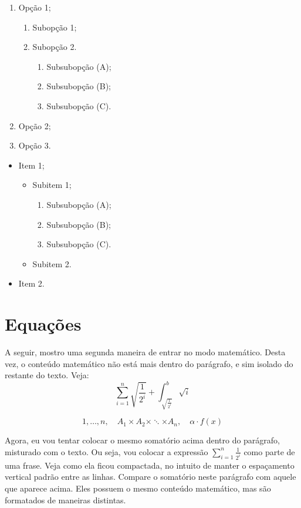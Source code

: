 \documentclass{article}
\begin{document}
\begin{enumerate}
    \item Opção 1;
    \begin{enumerate}
        \item Subopção 1;
        \item Subopção 2.
        \begin{enumerate}
            \item Subsubopção (A);
            \item Subsubopção (B);
            \item Subsubopção (C).
        \end{enumerate}
    \end{enumerate}
    \item Opção 2;
    \item Opção 3.
\end{enumerate}

\begin{itemize}
    \item Item 1;
    \begin{itemize}
        \item Subitem 1;
        \begin{enumerate}
            \item Subsubopção (A);
            \item Subsubopção (B);
            \item Subsubopção (C).
        \end{enumerate}
        \item Subitem 2.
    \end{itemize}
    \item Item 2.
\end{itemize}

\section{Equações}

A seguir, mostro uma segunda maneira de entrar no modo matemático. Desta vez, o conteúdo matemático não está mais dentro do parágrafo, e sim isolado do restante do texto. Veja:
\[
 \sum_{i=1}^{n} \sqrt{\frac{ 1 }{ 2^i }} + \int_{\sqrt{\frac{ 1 }{ 2^i }}}^{b} \sqrt{i}
\]

\[
1,\ldots,n, \quad A_1 \times A_2 \times \ddots \times A_n, \quad \alpha \cdot f(x)
\]

Agora, eu vou tentar colocar o mesmo somatório acima dentro do parágrafo, misturado com o texto. Ou seja, vou colocar a expressão $\sum_{i=1}^{n} \frac{1}{2^i}$ como parte de uma frase. Veja como ela ficou compactada, no intuito de manter o espaçamento vertical padrão entre as linhas. Compare o somatório neste parágrafo com aquele que aparece acima. Eles possuem o mesmo conteúdo matemático, mas são formatados de maneiras distintas.\\
\end{document}
